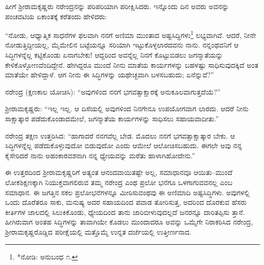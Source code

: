 ಹೀಗೆ ಶ್ರೀರಾಮಕೃಷ್ಣರು ನರೇಂದ್ರನನ್ನು ಪರಿಪರಿಯಾಗಿ ಪರೀಕ್ಷಿಸಿದರು. ಇನ್ನೊಂದು ದಿನ ಅವರು ಅವನನ್ನು ಪಂಚವಟಿಯ ಏಕಾಂತಕ್ಕೆ ಕರೆತಂದು ಹೇಳಿದರು:

“ನೋಡು, ಆಧ್ಯಾತ್ಮಿಕ ಸಾಧನೆಗಳ ಫಲವಾಗಿ ನನಗೆ ಅಣಿಮಾ ಮುಂತಾದ ಅಷ್ಟಸಿದ್ಧಿಗಳು\footnote{*ನೋಡಿ: ಅನುಬಂಧ ೧.} ಲಭ್ಯವಾಗಿವೆ. ಆದರೆ, ನೀನೇ ನೋಡುತ್ತಿದ್ದೀಯಲ್ಲ, ಮೈಮೇಲಿನ ಬಟ್ಟೆಯನ್ನೂ ಸರಿಯಾಗಿ ಇಟ್ಟುಕೊಳ್ಳಲಾರದವನು ನಾನು. ನನ್ನಂಥವನಿಗೆ ಆ ಸಿದ್ಧಿಗಳನ್ನೆಲ್ಲ ಕಟ್ಟಿಕೊಂಡು ಏನಾಗಬೇಕು! ಆದ್ದರಿಂದ ಅವನ್ನೆಲ್ಲ ನಿನಗೆ ಕೊಟ್ಟುಬಿಡಲು ಜಗನ್ಮಾತೆಯನ್ನು ಕೇಳಿಕೊಳ್ಳೋಣವೆಂದಿದ್ದೇನೆ. ಹೇಗಿದ್ದರೂ ಮುಂದೆ ನೀನು ಮಾತೆಯ ಕಾರ್ಯಗಳನ್ನು ಬಹಳಷ್ಟು ಸಾಧಿಸುವುದಕ್ಕಿದೆ ಅಂತ ಮಾತೆಯೇ ಹೇಳಿದ್ದಾಳೆ. ಆಗ ನೀನು ಈ ಸಿದ್ಧಿಗಳನ್ನು ಯಥೇಚ್ಛವಾಗಿ ಬಳಸಬಹುದು; ಏನೆನ್ನುವೆ?”

ನರೇಂದ್ರ (ಕ್ಷಣಕಾಲ ಯೋಚಿಸಿ): “ಅವುಗಳಿಂದ ನನಗೆ ಭಗವತ್ಸಾಕ್ಷಾರಕ್ಕೆ ಅನುಕೂಲವಾಗುತ್ತದೆಯೆ?”

ಶ್ರೀರಾಮಕೃಷ್ಣರು: “ಇಲ್ಲ ಇಲ್ಲ. ಆ ದಿಸೆಯಲ್ಲಿ ಅವುಗಳಿಂದ ನಿನಗೇನೂ ಉಪಯೋಗವಾಗ ಲಾರದು. ಆದರೆ ನೀನು ಸಾಕ್ಷಾತ್ಕಾರ ಪಡೆದುಕೊಂಡಾದಮೇಲೆ, ಜಗನ್ಮಾತೆಯ ಕಾರ್ಯಗಳನ್ನು ಸಾಧಿಸಲು ಸಹಾಯವಾದೀತು.”

ನರೇಂದ್ರ ತಕ್ಷಣ ಉತ್ತರಿಸಿದ: “ಹಾಗಾದರೆ ನನಗವೆಲ್ಲ ಬೇಡ. ಮೊದಲು ನನಗೆ ಭಗವತ್ಸಾಕ್ಷಾತ್ಕಾರ ಬೇಕು. ಆ ಸಿದ್ಧಿಗಳನ್ನೆಲ್ಲ ಪಡೆದುಕೊಳ್ಳುವುದೋ ಬಿಡುವುದೋ ಎಂದು ಆಮೇಲೆ ಆಲೋಚಿಸಬಹುದು. ಈಗಲೇ ಅವು ನನ್ನ ಕೈಸೇರಿದರೆ ನಾನು ಅಹಂಕಾರವಶನಾಗಿ ನನ್ನ ಧ್ಯೇಯವನ್ನು ಮರೆತು ಹಾಳಾಗಿಹೋದೇನು.”

ಈ ಉತ್ತರದಿಂದ ಶ್ರೀರಾಮಕೃಷ್ಣರಿಗೆ ಅತ್ಯಂತ ಆನಂದವಾಯಿತಷ್ಟೇ ಅಲ್ಲ, ಸಮಾಧಾನವೂ ಆಯಿತು–ಮುಂದೆ ಲೋಕಶಿಕ್ಷಣಕ್ಕಾಗಿ ನಿಯುಕ್ತವಾಗಲಿರುವ ತಮ್ಮ ನರೇಂದ್ರ ಎಂಥ ಪ್ರಲೋ ಭನೆಗೂ ಒಳಗಾಗುವವನಲ್ಲ ಎಂಬ ಸಮಾಧಾನ. ಈ ಜಗತ್ತಿನ ಸಕಲ ಪ್ರಲೋಭನೆಗಳನ್ನೂ ಮೀರಿಸುವಂಥವು ಈ ಅಣಿಮಾದಿ ಅಷ್ಟಸಿದ್ಧಿಗಳು. ಅವುಗಳಲ್ಲಿ ಒಂದು ದೊರೆತರೂ ಸಾಕು, ಮನುಷ್ಯ ಅದರ ಸಹಾಯದಿಂದ ಪವಾಡ ತೋರಿಸುತ್ತ, ಅದರಿಂದ ದೊರಕುವ ಹೆಸರು ಕೀರ್ತಿಗಳ ಜಾಲದಲ್ಲಿ ಸಿಲುಕಿಕೊಂಡು, ಧ್ಯೇಯದಿಂದ ತಾನು ಜಾರಿಬೀಳುವುದಲ್ಲದೆ ಜನರನ್ನೂ ದಾರಿತಪ್ಪಿಸು ತ್ತಾನೆ. ಹೀಗಿರುವಾಗ ಅಂತಹ ಸಿದ್ಧಿಗಳನ್ನು ತಾವಾಗಿಯೇ ಕೊಡಲು ಮುಂದಾದರೂ ಅವನ್ನು ಒಮ್ಮೆಗೇ ನಿರಾಕರಿಸಿದ ನರೇಂದ್ರ, ಶ್ರೀರಾಮಕೃಷ್ಣರೊಡ್ಡಿದ ಪರೀಕ್ಷೆಯಲ್ಲಿ ಮತ್ತೊಮ್ಮೆ ಉನ್ನತ ದರ್ಜೆಯಲ್ಲಿ ಉತ್ತೀರ್ಣನಾದ.


